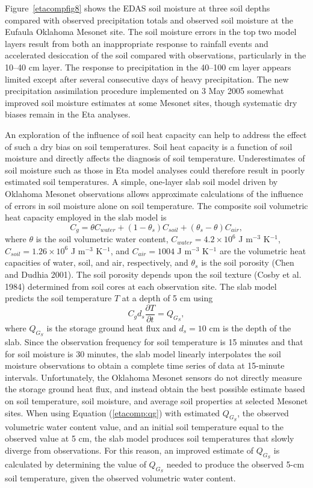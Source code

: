 \documentclass[twocolumn]{article}
\begin{document}
Figure~\ref{etacompfig8} shows the EDAS soil moisture at three soil depths compared with observed precipitation totals and observed soil moisture at the Eufaula Oklahoma Mesonet site.  The soil moisture errors in the top two model layers result from both an inappropriate response to rainfall events and accelerated desiccation of the soil compared with observations, particularly in the 10--40 cm layer.  The response to precipitation in the 40--100 cm layer appears limited except after several consecutive days of heavy precipitation.  The new precipitation assimilation procedure implemented on 3 May 2005 somewhat improved soil moisture estimates at some Mesonet sites, though systematic dry biases remain in the Eta analyses.

An exploration of the influence of soil heat capacity can help to address the effect of such a dry bias on soil temperatures.  Soil heat capacity is a function of soil moisture and directly affects the diagnosis of soil temperature.  Underestimates of soil moisture such as those in Eta model analyses could therefore result in poorly estimated soil temperatures.  A simple, one-layer slab soil model driven by Oklahoma Mesonet observations allows approximate calculations of the influence of errors in soil moisture alone on soil temperature.  The composite soil volumetric heat capacity employed in the slab model is
%
\begin{equation}\label{etacomp:cg}
C_g=\theta C_{water}+(1-\theta_s)C_{soil}+(\theta_s-\theta)C_{air},
\end{equation}
%
where $\theta$ is the soil volumetric water content, $C_{water} = 4.2 \times 10^6$ J m$^{-3}$ K$^{-1}$, $C_{soil} = 1.26 \times 10^6$ J m$^{-3}$ K$^{-1}$, and $C_{air} = 1004$ J m$^{-3}$ K$^{-1}$ are the volumetric heat capacities of water, soil, and air, respectively, and $\theta_s$ is the soil porosity (Chen and Dudhia 2001).  The soil porosity depends upon the soil texture (Cosby et al. 1984) determined from soil cores at each observation site.  The slab model predicts the soil temperature $T$ at a depth of 5 cm using
%
\begin{equation}\label{etacomp:qg}
C_g d_s\frac{\partial{T}}{\partial{t}} = Q_{G_S},
\end{equation}
%
where $Q_{G_S}$ is the storage ground heat flux and $d_s =10$ cm is the depth of the slab.  Since the observation frequency for soil temperature is 15 minutes and that for soil moisture is 30 minutes, the slab model linearly interpolates the soil moisture observations to obtain a complete time series of data at 15-minute intervals.  Unfortunately, the Oklahoma Mesonet sensors do not directly measure the storage ground heat flux, and instead obtain the best possible estimate based on soil temperature, soil moisture, and average soil properties at selected Mesonet sites.  When using Equation (\ref{etacomp:qg}) with estimated $Q_{G_S}$, the observed volumetric water content value, and an initial soil temperature equal to the observed value at 5 cm, the slab model produces soil temperatures that slowly diverge from observations.  For this reason, an improved estimate of $Q_{G_S}$ is calculated by determining the value of $Q_{G_S}$ needed to produce the observed 5-cm soil temperature, given the observed volumetric water content.
\end{document}
